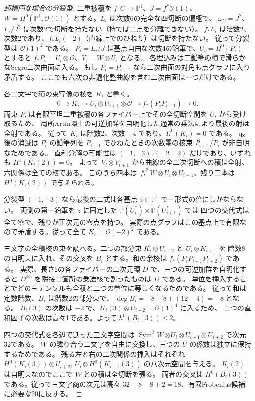 \begin{proof}[超楕円な場合の分裂型]
二重被覆を $f:C\to\mathbb P^1$、$J=f^*\mathcal O(1)$、
$W=H^0(\mathbb P^1,\mathcal O(1))$ とする。$L_i$ は次数6の完全な四切断の偏極で、
$\omega_C=J^2$、$L_i/J^2$ は次数2で切断を持たない（持てば二点を分離できない）。
$f_*L_i$ は階数2、次数2であり、$f_*L_i(-2)$（直線上でのひねり）は切断を持たない。
従って分裂型は $\mathcal O(1)^2$ である。
$P_i=L_i/J$ は基点自由な次数4の鉛筆で、$U_i=H^0(P_i)$ とすると
$f_*P_i=U_i\otimes\mathcal O$、$V_i=W\otimes U_i$ となる。
各埋込みは二鉛筆の積で滑らかなSegre二次曲面に入る。
もし $P_i=P_{i+1}$ なら二次曲面の対角も点グラフに入り矛盾する。
ここでも六次の非退化整曲線を含む二次曲面は一つだけである。

各二文字で積の束写像の核を $K_i$ と書く。
\[
 0\longrightarrow K_i\longrightarrow
 U_i\otimes U_{i+1}\otimes\mathcal O\longrightarrow f_*(P_i P_{i+1})\longrightarrow0 .
\]
両束 $P_i$ は有限平坦二重被覆の各ファイバー上でその全切断空間を $U_i$ から受け取るため、
局所Artin環上の可逆加群を自明化した通常の乗法により最後の射は全射である。
従って $K_i$ は階数2、次数 $-4$ であり、$H^0(K_i)=0$ である。
最後の消滅は $P_i$ の鉛筆列を $P_{i+1}$ でひねたときの次数零の核束
$P_{i+1}/P_i$ が非自明なためである。
直和分解の可能性は $(-1,-3),(-2,-2)$ だけであり、いずれも $H^1(K_i(2))=0$。
よって $V_i\otimes V_{i+1}$ から曲線の全二次切断への積は全射、六関係は全ての核である。
このうち四本は $\bigwedge^2 W\otimes U_i\otimes U_{i+1}$、残り二本は
$H^0(K_i(2))$ で与えられる。

分裂型 $(-1,-3)$ なら最後の二式は各基点 $z\in\mathbb P^1$ で一形式の倍にしかならない。
両側の第一鉛筆を $z$ に固定した $\mathbb P(U_i^*)\times\mathbb P(U_{i+1}^*)$ では
四つの交代式は全て零で、残りが正次元の零点を持つ。
実際の点グラフはこの基点上で有限なので矛盾する。従って全て $K_i=\mathcal O(-2)^2$ である。

三文字の全積核の束を調べる。二つの部分束 $K_i\otimes U_{i+2}$ と $U_i\otimes K_{i+1}$ を
階数8の自明束に入れ、その交叉を $B_i$ とする。和の余核は $f_*(P_iP_{i+1}P_{i+2})$ である。
実際、長さ2の各ファイバーの二次元環 $D$ で、三つの可逆加群を自明化すると
$D^{\otimes3}$ を隣接二箇所の乗法核で割ったものは $D$ である。
単位を挿入することでどの三テンソルも全積と二つの単位に等しくなるためである。
従って和は定数階数、$B_i$ は階数2の部分束で、
$\deg B_i=-8-8+(12-4)=-8$ となる。
$B_i(3)$ の次数は $-2$ で、$K_i(3)\otimes U_{i+2}=\mathcal O(1)^4$ に入るため、
二つの直和因子の次数は高々1である。よって $h^0(B_i(3))\le2$。

四つの交代式を各辺で割った三文字空間は
$\operatorname{Sym}^3 W\otimes U_i\otimes U_{i+1}\otimes U_{i+2}$ で次元32である。
$W$ の隣り合う二文字を自由に交換し、三つの $U$ の係数は独立に保持するためである。
残る左と右の二次関係の挿入はそれぞれ $H^0(K_i(3))\otimes U_{i+2}$,
$U_i\otimes H^0(K_{i+1}(3))$ の八次元空間を与える。
$K_i(2)$ は自明束なのでここで $W$ との積は全切断を張る。
両者の交叉は $H^0(B_i(3))$ である。従って三文字商の次元は高々
$32-8-8+2=18$、有限Frobenius候補に必要な20に反する。
\end{proof}
